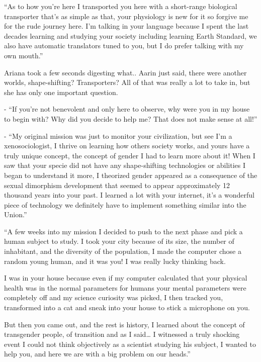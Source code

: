 \documentclass[hidelinks,12pt,a4paper]{book}
\begin{document}
“As to how you're here I transported you here with a short-range biological transporter that's as simple as that, 
your physiology is new for it so forgive me for the rude journey here. I'm talking in your language because I spent the
 last decades learning and studying your society including learning Earth Standard, we also have automatic translators 
 tuned to you, but I do prefer talking with my own mouth.”\par
 \bigskip

Ariana took a few seconds digesting what.. Aarin just said, there were another worlds, shape-shifting? Transporters? 
All of that was really a lot to take in, but she has only one important question.\par
\bigskip

- “If you're not benevolent and only here to observe, why were you in my house to begin with? 
Why did you decide to help me? That does not make sense at all!”\par
\bigskip

- “My original mission was just to monitor your civilization, but see I'm a xenosociologist, I thrive on learning 
how others society works, and yours have a truly unique concept, the concept of gender I had to learn more about it! 
When I saw that your specie did not have any shape-shifting technologies or abilities I began to
 understand it more, I theorized gender appeared as a consequence of the sexual dimorphism development 
 that seemed to appear approximately 12 thousand years into your past. I learned a lot with your internet, 
 it's a wonderful piece of technology we definitely have to implement something similar into the Union.”\par
 \bigskip

“A few weeks into my mission I decided to push to the next phase and pick a human subject to study. I took your city 
because of its size, the number of inhabitant, and the diversity of the population, I made the computer chose a 
random young human, and it was you! I was really lucky thinking back.\par
\bigskip

I was in your house because even if my computer calculated that your physical health was in the normal parameters 
for humans your mental parameters were completely off and my science curiosity was picked, I then tracked you,
 transformed into a cat and sneak into your house to stick a microphone on you. \par
 \bigskip

But then you came out, and the rest is history, I learned about the concept of transgender people, of 
transition and as I said… I witnessed a truly shocking event I could not think objectively as a scientist 
studying his subject, I wanted to help you, and here we are with a big problem on our heads.”\par
\bigskip
\end{document}
